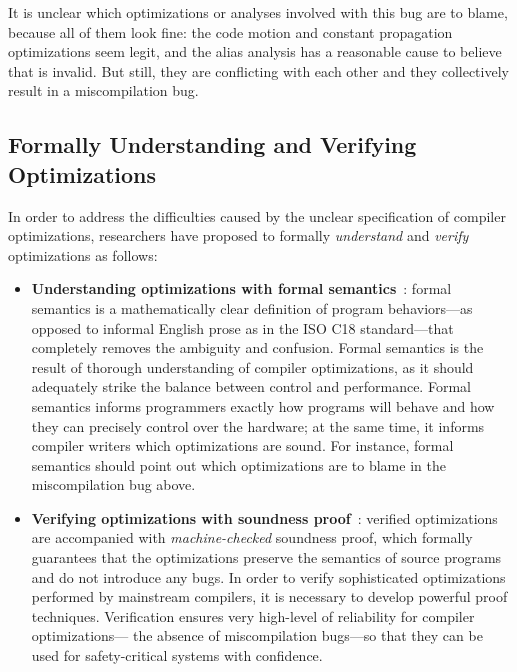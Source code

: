 \noindent It is unclear which optimizations or analyses involved with this bug are to blame, because
all of them look fine: the code motion and constant propagation optimizations seem legit, and the
alias analysis has a reasonable cause to believe that  is invalid.  But still, they are
conflicting with each other and they collectively result in a miscompilation bug.



\subsection{Formally Understanding and Verifying Optimizations}

In order to address the difficulties caused by the unclear specification of compiler optimizations,
researchers have proposed to formally \emph{understand} and \emph{verify} optimizations as follows:

\begin{itemize}
\item \textbf{Understanding optimizations with formal
    semantics}~\cite{norrish1998c,leroy:compcert,ellison2012executable}: formal semantics is a
  mathematically clear definition of program behaviors---as opposed to informal English prose as in
  the ISO C18 standard---that completely removes the ambiguity and confusion.  Formal semantics is
  the result of thorough understanding of compiler optimizations, as it should adequately strike the
  balance between control and performance.  Formal semantics informs programmers exactly how
  programs will behave and how they can precisely control over the hardware; at the same time, it
  informs compiler writers which optimizations are sound.  For instance, formal semantics should
  point out which optimizations are to blame in the miscompilation bug above.

\item \textbf{Verifying optimizations with soundness proof}~\cite{compcert,vellvm}: verified
  optimizations are accompanied with \emph{machine-checked} soundness proof, which formally
  guarantees that the optimizations preserve the semantics of source programs and do not introduce
  any bugs.  In order to verify sophisticated optimizations performed by mainstream compilers, it is
  necessary to develop powerful proof techniques.  Verification ensures very high-level of
  reliability for compiler optimizations---\ie{} the absence of miscompilation bugs---so that they
  can be used for safety-critical systems with confidence.

\end{itemize}


